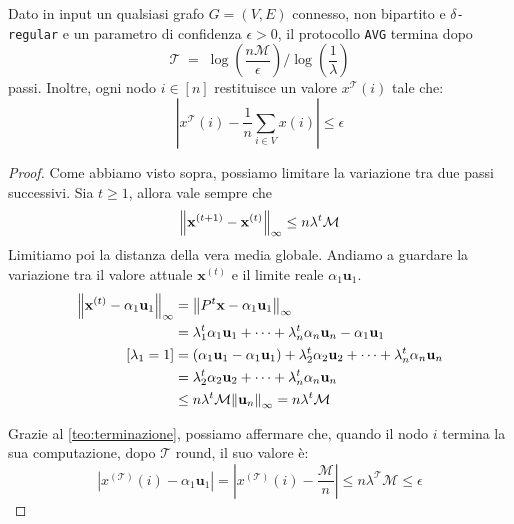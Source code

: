 \begin{teorema}
    Dato in input un qualsiasi grafo $G = (V, E)$ connesso, non bipartito e $\delta$\texttt{-regular} e un parametro di confidenza $\epsilon > 0$, il protocollo \texttt{AVG} termina dopo
    \[
        \mathcal{T} \;=\; \log\left(\frac{n\mathcal{M}}{\epsilon}\right) / \log\left(\frac{1}{\lambda}\right)
    \]
    passi. Inoltre, ogni nodo $i \in [n]$ restituisce un valore $x^{\mathcal{T}}(i)$ tale che:
    \[
        \left| x^{\mathcal{T}}(i) - \frac{1}{n}\sum_{i \in V} x(i) \right| \leq \epsilon
    \]
    \begin{proof}
        Come abbiamo visto sopra, possiamo limitare la variazione tra due passi successivi. Sia $t \geq 1$, allora vale sempre che
        \[
            \norm{\mathbf{x}^{(t+1)} - \mathbf{x}^{(t)}}_{\infty} \leq n\lambda^t\mathcal{M}
        \]
        Limitiamo poi la distanza della vera media globale. Andiamo a guardare la variazione tra il valore attuale $\mathbf{x}^{(t)}$ e il limite reale $\alpha_1\mathbf{u}_1$.
        \begin{align*}
            \norm{\mathbf{x}^{(t)} - \alpha_1\mathbf{u}_1}_{\infty} &= \norm{P^{t}\mathbf{x} - \alpha_1\mathbf{u}_1}_{\infty} \\
            &= \lambda_1^{t}\alpha_1\mathbf{u}_1 + \dots + \lambda_n^{t}\alpha_n\mathbf{u}_n - \alpha_1\mathbf{u}_1 \\
            [\lambda_1 = 1] &= (\alpha_1\mathbf{u}_1 - \alpha_1\mathbf{u}_1) + \lambda_2^{t}\alpha_2\mathbf{u}_2 + \dots + \lambda_n^{t}\alpha_n\mathbf{u}_n \\
            &=  \lambda_2^{t}\alpha_2\mathbf{u}_2 + \dots + \lambda_n^{t}\alpha_n\mathbf{u}_n \\
            &\leq n\lambda^t\mathcal{M}\norm{\mathbf{u}_n}_\infty = n\lambda^t\mathcal{M}
        \end{align*}

        Grazie al \autoref{teo:terminazione}, possiamo affermare che, quando il nodo $i$ termina la sua computazione, dopo $\mathcal{T}$ round, il suo valore è:
        \[
            \left|x^{(\mathcal{T})}(i) - \alpha_1\mathbf{u}_1\right| = \left|x^{(\mathcal{T})}(i) - \frac{\mathcal{M}}{n}\right| \leq n\lambda^{\mathcal{T}}\mathcal{M} \leq \epsilon
        \]
    \end{proof}
\end{teorema}